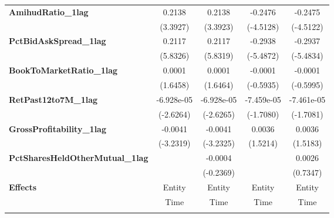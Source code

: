 {\begin{longtable}{>{\bfseries}lcccc}
\textbf{AmihudRatio\_1lag}                 &       0.2138       &              0.2138             &      -0.2476       &          -0.2475            \\
\textbf{ }                                 &      (3.3927)      &             (3.3923)            &     (-4.5128)      &         (-4.5122)           \\
\textbf{PctBidAskSpread\_1lag}             &       0.2117       &              0.2117             &      -0.2938       &          -0.2937            \\
\textbf{ }                                 &      (5.8326)      &             (5.8319)            &     (-5.4872)      &         (-5.4834)           \\
\textbf{BookToMarketRatio\_1lag}           &       0.0001       &              0.0001             &      -0.0001       &          -0.0001            \\
\textbf{ }                                 &      (1.6458)      &             (1.6464)            &     (-0.5935)      &         (-0.5995)           \\
\textbf{RetPast12to7M\_1lag}               &     -6.928e-05     &            -6.928e-05           &     -7.459e-05     &         -7.461e-05          \\
\textbf{ }                                 &     (-2.6264)      &            (-2.6265)            &     (-1.7080)      &         (-1.7081)           \\
\textbf{GrossProfitability\_1lag}          &      -0.0041       &             -0.0041             &       0.0036       &           0.0036            \\
\textbf{ }                                 &     (-3.2319)      &            (-3.2325)            &      (1.5214)      &          (1.5183)           \\
\textbf{PctSharesHeldOtherMutual\_1lag}    &                    &             -0.0004             &                    &           0.0026            \\
\textbf{ }                                 &                    &            (-0.2369)            &                    &          (0.7347)           \\
\midrule
\textbf{Effects}                           &       Entity       &              Entity             &       Entity       &           Entity            \\
& Time & Time & Time & Time\\
\bottomrule
\bigskip\\

\end{longtable}}
